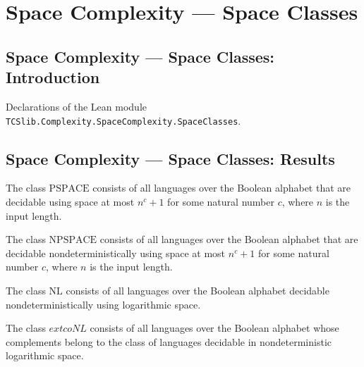 \section{Space Complexity --- Space Classes}
\subsection*{Space Complexity --- Space Classes: Introduction}

Declarations of the Lean module \texttt{TCSlib.Complexity.SpaceComplexity.SpaceClasses}.

\subsection*{Space Complexity --- Space Classes: Results}

\begin{definition}
\label{Complexity.PSPACE}
\leanok
{}
The class $\mathrm{PSPACE}$ consists of all languages over the Boolean alphabet that are
decidable using space at most $n^c+1$ for some natural number $c$, where $n$ is the
input length.
\end{definition}

\begin{definition}
\label{Complexity.NPSPACE}
\leanok
{}
The class $\mathrm{NPSPACE}$ consists of all languages over the Boolean alphabet that
are decidable nondeterministically using space at most $n^c+1$ for some natural number
$c$, where $n$ is the input length.
\end{definition}

\begin{definition}
\label{Complexity.NL}
\leanok
{}
The class $\mathrm{NL}$ consists of all languages over the Boolean alphabet decidable
nondeterministically using logarithmic space.
\end{definition}

\begin{definition}
\label{Complexity.coNL}
\leanok
{}
The class $	ext{coNL}$ consists of all languages over the Boolean alphabet whose
complements belong to the class of languages decidable in nondeterministic logarithmic
space.
\end{definition}

